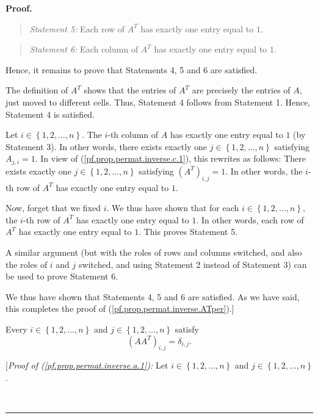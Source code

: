 \documentclass[numbers=enddot,12pt,final,onecolumn,notitlepage]{scrartcl}%
\theoremstyle{definition}
\newenvironment{statement}{\begin{quote}}{\end{quote}}
\newenvironment{proof}[1][Proof]{\noindent\textbf{#1.} }{\ \rule{0.5em}{0.5em}}
\begin{document}
\begin{proof}
\begin{statement}
\textit{Statement 5:} Each row of $A^{T}$ has exactly one entry equal to $1$.
\end{statement}

\begin{statement}
\textit{Statement 6:} Each column of $A^{T}$ has exactly one entry equal to
$1$.
\end{statement}

Hence, it remains to prove that Statements 4, 5 and 6 are satisfied.

The definition of $A^{T}$ shows that the entries of $A^{T}$ are precisely the
entries of $A$, just moved to different cells. Thus, Statement 4 follows from
Statement 1. Hence, Statement 4 is satisfied.

Let $i\in\left\{  1,2,\ldots,n\right\}  $. The $i$-th column of $A$ has
exactly one entry equal to $1$ (by Statement 3). In other words, there exists
exactly one $j\in\left\{  1,2,\ldots,n\right\}  $ satisfying $A_{j,i}=1$. In
view of (\ref{pf.prop.permat.inverse.c.1}), this rewrites as follows: There
exists exactly one $j\in\left\{  1,2,\ldots,n\right\}  $ satisfying $\left(
A^{T}\right)  _{i,j}=1$. In other words, the $i$-th row of $A^{T}$ has exactly
one entry equal to $1$.

Now, forget that we fixed $i$. We thus have shown that for each $i\in\left\{
1,2,\ldots,n\right\}  $, the $i$-th row of $A^{T}$ has exactly one entry equal
to $1$. In other words, each row of $A^{T}$ has exactly one entry equal to
$1$. This proves Statement 5.

A similar argument (but with the roles of rows and columns switched, and also
the roles of $i$ and $j$ switched, and using Statement 2 instead of Statement
3) can be used to prove Statement 6.

We thus have shown that Statements 4, 5 and 6 are satisfied. As we have said,
this completes the proof of (\ref{pf.prop.permat.inverse.ATper}).]

Every $i\in\left\{  1,2,\ldots,n\right\}  $ and $j\in\left\{  1,2,\ldots
,n\right\}  $ satisfy%
\begin{equation}
\left(  AA^{T}\right)  _{i,j}=\delta_{i,j}. \label{pf.prop.permat.inverse.a.1}%
\end{equation}


[\textit{Proof of (\ref{pf.prop.permat.inverse.a.1}):} Let $i\in\left\{
1,2,\ldots,n\right\}  $ and $j\in\left\{  1,2,\ldots,n\right\}  $.


\end{proof}
\end{document}
